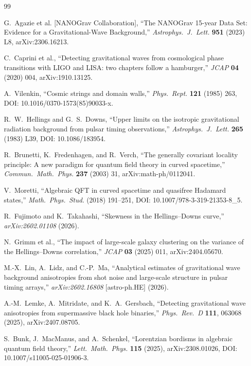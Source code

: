 \documentclass[11pt,a4paper]{article}
\begin{document}
\begin{thebibliography}{99}

G.~Agazie et al. [NANOGrav Collaboration],
``The NANOGrav 15-year Data Set: Evidence for a Gravitational-Wave Background,''
\textit{Astrophys.\ J.\ Lett.} \textbf{951} (2023) L8, arXiv:2306.16213.

C.~Caprini et al.,
``Detecting gravitational waves from cosmological phase transitions with LIGO and LISA: two chapters follow a hamburger,''
\textit{JCAP} \textbf{04} (2020) 004, arXiv:1910.13125.

A.~Vilenkin,
``Cosmic strings and domain walls,''
\textit{Phys.\ Rept.} \textbf{121} (1985) 263, DOI: 10.1016/0370-1573(85)90033-x.

R.~W.~Hellings and G.~S.~Downs,
``Upper limits on the isotropic gravitational radiation background from pulsar timing observations,''
\textit{Astrophys.\ J.\ Lett.} \textbf{265} (1983) L39, DOI: 10.1086/183954.

R.~Brunetti, K.~Fredenhagen, and R.~Verch,
``The generally covariant locality principle: A new paradigm for quantum field theory in curved spacetime,''
\textit{Commun.\ Math.\ Phys.} \textbf{237} (2003) 31, arXiv:math-ph/0112041.

V.~Moretti,
``Algebraic QFT in curved spacetime and quasifree Hadamard states,''
\textit{Math.\ Phys.\ Stud.} (2018) 191--251, DOI: 10.1007/978-3-319-21353-8\_5.

R.~Fujimoto and K.~Takahashi,
``Skewness in the Hellings--Downs curve,''
\textit{arXiv:2602.01108} (2026).

N.~Grimm et al.,
``The impact of large-scale galaxy clustering on the variance of the Hellings--Downs correlation,''
\textit{JCAP} \textbf{03} (2025) 011, arXiv:2404.05670.

M.-X.~Lin, A.~Lidz, and C.-P.~Ma,
``Analytical estimates of gravitational wave background anisotropies from shot noise and large-scale structure in pulsar timing arrays,''
\textit{arXiv:2602.16808} [astro-ph.HE] (2026).

A.-M.~Lemke, A.~Mitridate, and K.~A.~Gersbach,
``Detecting gravitational wave anisotropies from supermassive black hole binaries,''
\textit{Phys.\ Rev.\ D} \textbf{111}, 063068 (2025), arXiv:2407.08705.

S.~Bunk, J.~MacManus, and A.~Schenkel,
``Lorentzian bordisms in algebraic quantum field theory,''
\textit{Lett.\ Math.\ Phys.} \textbf{115} (2025), arXiv:2308.01026, DOI: 10.1007/s11005-025-01906-3.


\end{thebibliography}
\end{document}
